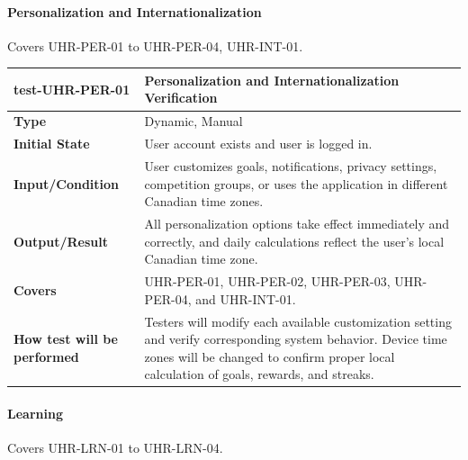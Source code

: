\documentclass[12pt, titlepage]{article}
\begin{document}
\paragraph{Personalization and Internationalization}

Covers UHR-PER-01 to UHR-PER-04, UHR-INT-01.

\noindent\begin{tabularx}{\textwidth}{>{\raggedright\arraybackslash}p{3.5cm}X}
  \toprule
  \textbf{test-UHR-PER-01} & \textbf{Personalization and Internationalization Verification}\\
  \midrule
  \textbf{Type} & Dynamic, Manual\\
  \textbf{Initial State} & User account exists and user is logged in.\\
  \textbf{Input/Condition} & User customizes goals, notifications, privacy settings, competition groups, or uses the application in different Canadian time zones.\\
  \textbf{Output/Result} & All personalization options take effect immediately and correctly, and daily calculations reflect the user's local Canadian time zone.\\
  \textbf{Covers} & UHR-PER-01, UHR-PER-02, UHR-PER-03, UHR-PER-04, and UHR-INT-01.\\
  \textbf{How test will be performed} & Testers will modify each available customization setting and verify corresponding system behavior. Device time zones will be changed to confirm proper local calculation of goals, rewards, and streaks.\\
  \bottomrule
\end{tabularx}

\paragraph{Learning}

Covers UHR-LRN-01 to UHR-LRN-04.
\end{document}
